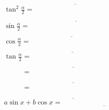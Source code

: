 \documentclass[headheight=4.5cm,
			   margin=2cm,
			   titlewidth=0.6,
			   sansserif,
			   firstcolor=color1,
			   secondcolor=color2,
			   logo=myLogo.png,
			  ]{TelecomNancy}
\begin{document}
			$\phantom{\cos^2\frac{\alpha}{2}=}\underline{\hspace{5cm}}$\\
			$\tan^2\frac{\alpha}{2}=$\\
			$\phantom{\tan^2\frac{\alpha}{2}=}\underline{\hspace{5cm}}$\\
			$\sin\frac{\alpha}{2}=$\\
			$\phantom{\sin\frac{\alpha}{2}=}\underline{\hspace{5cm}}$\\
			$\cos\frac{\alpha}{2}=$\\
			$\phantom{\cos\frac{\alpha}{2}=}\underline{\hspace{5cm}}$\\
			$\tan\frac{\alpha}{2}=$\\
			$\phantom{\tan\frac{\alpha}{2}=}\underline{\hspace{5cm}}$\\
			$\phantom{\tan\frac{\alpha}{2}}=$\\
			$\phantom{\tan\frac{\alpha}{2}=}\underline{\hspace{5cm}}$\\
			$\phantom{\tan\frac{\alpha}{2}}=$\\
			$\phantom{\tan\frac{\alpha}{2}=}\underline{\hspace{5cm}}$\\
			$a\sin x+b\cos x=\underline{\hspace{5cm}}$
\end{document}
